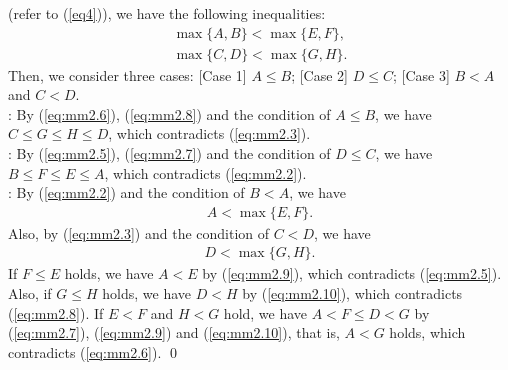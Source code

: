 \documentclass[a4paper]{llncs}
\begin{document}
(refer to (\ref{eq4})), we have the following inequalities:
\begin{eqnarray}
\max \{A, B \} < \max \{ E, F \}, \label{eq:mm2.2} \\
\max \{C, D \} < \max \{ G, H \}. \label{eq:mm2.3}
\end{eqnarray}
Then, we consider three cases:
[Case 1] $A \le B$; [Case 2] $D \le C$; [Case 3] $B < A$ and $C < D$. \\
\noindent
[Case 1]: By (\ref{eq:mm2.6}), (\ref{eq:mm2.8}) and the condition of $A \le B$, we have $C \le G \le H \le D$, which contradicts (\ref{eq:mm2.3}).\\
\noindent
[Case 2]: By (\ref{eq:mm2.5}), (\ref{eq:mm2.7}) and the condition of $D \le C$, we have $B \le F \le E \le A$, which contradicts (\ref{eq:mm2.2}).\\
\noindent
[Case 3]: By (\ref{eq:mm2.2}) and the condition of $B < A$, we have 
\begin{eqnarray}
A < \max \{ E, F \}. \label{eq:mm2.9}
\end{eqnarray}
Also, by (\ref{eq:mm2.3}) and the condition of $C < D$, we have
\begin{eqnarray}
D < \max \{ G, H \}. \label{eq:mm2.10}
\end{eqnarray}
If $F \le E$ holds, we have $A < E$ by (\ref{eq:mm2.9}), which contradicts (\ref{eq:mm2.5}).
Also, if $G \le H$ holds, we have $D < H$ by (\ref{eq:mm2.10}), which contradicts (\ref{eq:mm2.8}).
If $E < F$ and $H < G$ hold, we have $A < F \le D < G$ by (\ref{eq:mm2.7}), (\ref{eq:mm2.9}) and (\ref{eq:mm2.10}), 
that is, $A < G$ holds, which contradicts (\ref{eq:mm2.6}).
\qed
\end{document}
